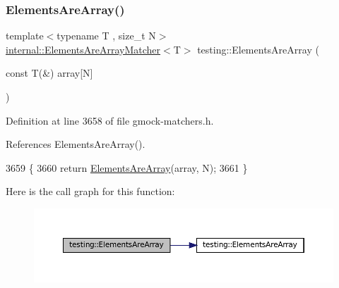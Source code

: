 \subsubsection{\texorpdfstring{Elements\+Are\+Array()}{ElementsAreArray()}\hspace{0.1cm}{\footnotesize\ttfamily [3/4]}}
{\footnotesize\ttfamily template$<$typename T , size\+\_\+t N$>$ \\
\hyperlink{classtesting_1_1internal_1_1ElementsAreArrayMatcher}{internal\+::\+Elements\+Are\+Array\+Matcher}$<$T$>$ testing\+::\+Elements\+Are\+Array (\begin{DoxyParamCaption}\item[{const T(\&)}]{array\mbox{[}\+N\mbox{]} }\end{DoxyParamCaption})\hspace{0.3cm}{\ttfamily [inline]}}



Definition at line 3658 of file gmock-\/matchers.\+h.



References Elements\+Are\+Array().


\begin{DoxyCode}
3659                          \{
3660   \textcolor{keywordflow}{return} \hyperlink{namespacetesting_ad257747adbe056feaa92f449063d681f}{ElementsAreArray}(array, N);
3661 \}
\end{DoxyCode}
Here is the call graph for this function\+:
\nopagebreak
\begin{figure}[H]
\begin{center}
\leavevmode
\includegraphics[width=350pt]{namespacetesting_ac5895c9867d6b976351446a043dcdd66_cgraph}
\end{center}
\end{figure}
\mbox{\label{namespacetesting_ad257747adbe056feaa92f449063d681f}} 
